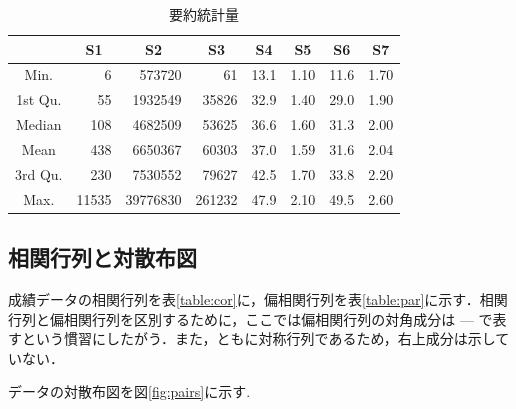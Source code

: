 \documentclass[11pt,dvipdfmx]{jarticle}
\theoremstyle{definition}
\begin{document}
\begin{table}[htbp]
    \caption{要約統計量}
    \label{table:summary}
    \begin{center}
        {\small
        \begin{tabular}{|c|rrrrrrr|}
            \hline
            & \multicolumn{1}{c}{S1} & \multicolumn{1}{c}{S2} & \multicolumn{1}{c}{S3} & \multicolumn{1}{c}{S4} & \multicolumn{1}{c}{S5} & \multicolumn{1}{c}{S6} & \multicolumn{1}{c|}{S7} \\ \hline
            Min.    & 6                      & 573720                 & 61     & 13.1 & 1.10 & 11.6 & 1.70 \\
            1st Qu. & 55                     & 1932549                & 35826  & 32.9 & 1.40 & 29.0 & 1.90 \\
            Median  & 108                    & 4682509                & 53625  & 36.6 & 1.60 & 31.3 & 2.00 \\
            Mean    & 438                    & 6650367                & 60303  & 37.0 & 1.59 & 31.6 & 2.04 \\
            3rd Qu. & 230                    & 7530552                & 79627  & 42.5 & 1.70 & 33.8 & 2.20 \\
            Max.    & 11535                  & 39776830               & 261232 & 47.9 & 2.10 & 49.5 & 2.60 \\ \hline
        \end{tabular}
    }
    \end{center}
\end{table}


\subsection{相関行列と対散布図}

成績データの相関行列を表\ref{table:cor}に，偏相関行列を表\ref{table:par}に示す．相関行列と偏相関行列を区別するために，ここでは偏相関行列の対角成分は --- で表すという慣習にしたがう．また，ともに対称行列であるため，右上成分は示していない．


データの対散布図を図\ref{fig:pairs}に示す. 
\end{document}
